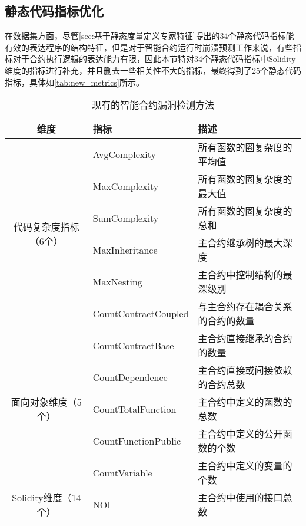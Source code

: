 \subsection{静态代码指标优化}
在数据集方面，尽管\autoref{sec:基于静态度量定义专家特征}提出的34个静态代码指标能有效的表达程序的结构特征，但是对于智能合约运行时崩溃预测工作来说，有些指标对于合约执行逻辑的表达能力有限，因此本节特对34个静态代码指标中Solidity维度的指标进行补充，并且删去一些相关性不大的指标，最终得到了25个静态代码指标，具体如\autoref{tab:new_metrics}所示。
\begin{table}[htbp]
    \caption{\label{tab:new_metrics}现有的智能合约漏洞检测方法}
    \small
            \renewcommand{\arraystretch}{1.5}
        \begin{tabularx}{\linewidth}{cp{3.5cm}<{\centering}X<{\raggedright}}
            \hline
            \textbf{维度}            & \textbf{指标}              & \textbf{描述} \\ \hline
            \multirow{6}{*}{代码复杂度指标（6个）} & AvgComplexity        & 所有函数的圈复杂度的平均值 \\
                                       & MaxComplexity        & 所有函数的圈复杂度的最大值 \\
                                       & SumComplexity        & 所有函数的圈复杂度的总和 \\
                                       & MaxInheritance   & 主合约继承树的最大深度 \\
                                       & MaxNesting           & 主合约中控制结构的最深级别 \\
                                       & CountContractCoupled  & 与主合约存在耦合关系的合约的数量 \\ \hline
            \multirow{5}{*}{面向对象维度（5个）} & CountContractBase    &  主合约直接继承的合约的数量 \\
                                       & CountDependence      & 主合约直接或间接依赖的合约总数 \\
                                       & CountTotalFunction   & 主合约中定义的函数的总数 \\
                                       & CountFunctionPublic  & 主合约中定义的公开函数的个数 \\
                                       & CountVariable        & 主合约中定义的变量的个数 \\ \hline
            \multirow{14}{*}{Solidity维度（14个）} & NOI                 & 主合约中使用的接口总数 \\

\end{tabularx}
\end{table}
